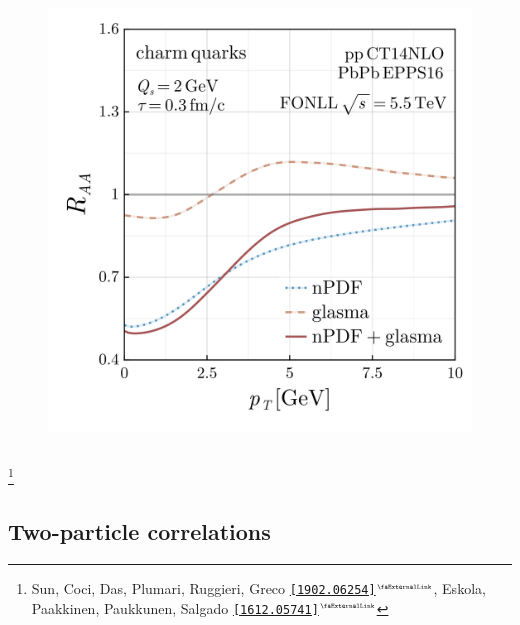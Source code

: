 \documentclass[aspectratio=169,11pt,usenames,dvipsnames]{beamer}
\renewcommand{\thefootnote}{\color{customblue}\faPaperPlaneO}
\newcommand\blfootnote[1]{%
  \begingroup
  \renewcommand\thefootnote{}\footnote{#1}%
  \addtocounter{footnote}{-1}%
  \endgroup
}
\begin{document}
\begin{frame}
\begin{center}
\begin{columns}[onlytextwidth,t]
\begin{figure}
                \includegraphics[width=0.82\columnwidth]{images/clean_raa_tau_0.3_charm_quark_Qs_2.0_fonll_pdf_vs_npdf_v3.png}
            \end{figure}
        \end{columns}    
    \end{center}
    \vspace{-15pt}
    \blfootnote{\scriptsize Sun, Coci, Das, Plumari, Ruggieri, Greco \href{https://arxiv.org/abs/1902.06254}{{\color{lightgray}\texttt{[1902.06254]$^\text{\tiny\faExternalLink}$}}}, Eskola, Paakkinen, Paukkunen, Salgado \href{https://arxiv.org/abs/1612.05741}{{\color{palteal}\texttt{[1612.05741]$^\text{\tiny\faExternalLink}$}}}}
\end{frame}


\subsection{Two-particle correlations}

\end{document}
